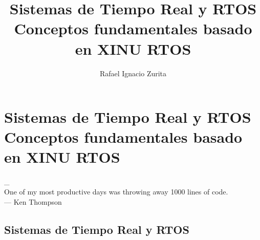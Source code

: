 \documentclass[output=paper, 
colorlinks,
citecolor=brown,
newtxmath
]{langscibook}
\author{Rafael Ignacio Zurita\affiliation{Universidad Nacional del Comahue}}
\title{Sistemas de Tiempo Real y RTOS \\ Conceptos fundamentales basado en XINU RTOS}
\begin{document}

\chapterfont{\Large\color{LightBlue}} 
\chapter*{Sistemas de Tiempo Real y RTOS \\ Conceptos fundamentales basado en XINU RTOS}

\begingroup
\let\clearpage\relax
\cleardoublepage
\hypersetup{linkcolor=blue}
\tableofcontents*
\endgroup

{\def\addcontentsline#1#2#3{}\maketitle}

\setcounter{page}{1}


\hfill\begin{minipage}{0.8\linewidth} \footnotesize
\_\\One of my most productive days was throwing away 1000 lines of code.\\
— Ken Thompson
\end{minipage}


\def\maketitle{

 \makeatletter
 {\color{bl} \centering \huge \sc \textbf{
\large \vspace*{-8pt} \color{black} Programación de Sistemas Embebidos
 \vspace*{8pt} }\par}
 \makeatother


 \makeatletter
 {\centering \small 
 	Departamento de Ingeniería de Computadoras \\
 	Facultad de Informática - Universidad Nacional del Comahue \\
 	\vspace{20pt} }
 \makeatother

}









\section {Sistemas de Tiempo Real y RTOS}
\end{document}
